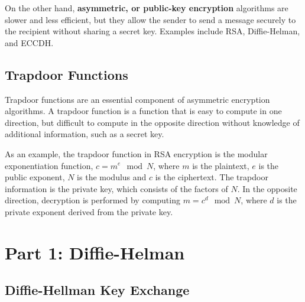\documentclass{article}
\begin{document}
    \vspace{3mm}
    On the other hand, \textbf{asymmetric, or public-key encryption} algorithms are slower and less efficient, but they allow the sender to send a message securely to the recipient without sharing a secret key. Examples include RSA, Diffie-Helman, and ECCDH.

\subsection*{Trapdoor Functions}
    
    Trapdoor functions are an essential component of asymmetric encryption algorithms. A trapdoor function is a function that is easy to compute in one direction, but difficult to compute in the opposite direction without knowledge of additional information, such as a secret key.
    
    \vspace{2mm}
    As an example, the trapdoor function in RSA encryption is the modular exponentiation function, $c = m^e \mod N$, where $m$ is the plaintext, $e$ is the public exponent, $N$ is the modulus and $c$ is the ciphertext. The trapdoor information is the private key, which consists of the factors of $N$. In the opposite direction, decryption is performed by computing $m = c^d \mod N$, where $d$ is the private exponent derived from the private key.


\section*{Part 1: Diffie-Helman}

\subsection*{Diffie-Hellman Key Exchange}
\end{document}
